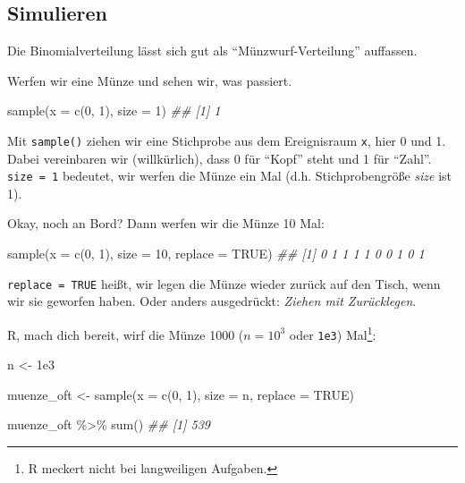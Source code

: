 \documentclass[
  a4paper,
  DIV=11]{scrreprt}
\newenvironment{Shaded}{\begin{snugshade}}{\end{snugshade}}
\newcommand{\AttributeTok}[1]{\textcolor[rgb]{0.40,0.45,0.13}{#1}}
\newcommand{\ConstantTok}[1]{\textcolor[rgb]{0.56,0.35,0.01}{#1}}
\newcommand{\DecValTok}[1]{\textcolor[rgb]{0.68,0.00,0.00}{#1}}
\newcommand{\DocumentationTok}[1]{\textcolor[rgb]{0.37,0.37,0.37}{\textit{#1}}}
\newcommand{\FloatTok}[1]{\textcolor[rgb]{0.68,0.00,0.00}{#1}}
\newcommand{\FunctionTok}[1]{\textcolor[rgb]{0.28,0.35,0.67}{#1}}
\newcommand{\NormalTok}[1]{\textcolor[rgb]{0.00,0.23,0.31}{#1}}
\newcommand{\OtherTok}[1]{\textcolor[rgb]{0.00,0.23,0.31}{#1}}
\newcommand{\SpecialCharTok}[1]{\textcolor[rgb]{0.37,0.37,0.37}{#1}}
\theoremstyle{definition}
\theoremstyle{remark}
\begin{document}
\hypertarget{simulieren}{%
\subsection{Simulieren}\label{simulieren}}

Die Binomialverteilung lässt sich gut als ``Münzwurf-Verteilung''
auffassen.

Werfen wir eine Münze und sehen wir, was passiert.

\begin{Shaded}
\begin{Highlighting}[]
\FunctionTok{sample}\NormalTok{(}\AttributeTok{x =} \FunctionTok{c}\NormalTok{(}\DecValTok{0}\NormalTok{, }\DecValTok{1}\NormalTok{), }\AttributeTok{size =} \DecValTok{1}\NormalTok{)}
\DocumentationTok{\#\# [1] 1}
\end{Highlighting}
\end{Shaded}

Mit \texttt{sample()} ziehen wir eine Stichprobe aus dem Ereignisraum
\texttt{x}, hier 0 und 1. Dabei vereinbaren wir (willkürlich), dass 0
für ``Kopf'' steht und 1 für ``Zahl''. \texttt{size\ =\ 1} bedeutet, wir
werfen die Münze ein Mal (d.h. Stichprobengröße \emph{size} ist 1).

Okay, noch an Bord? Dann werfen wir die Münze 10 Mal:

\begin{Shaded}
\begin{Highlighting}[]
\FunctionTok{sample}\NormalTok{(}\AttributeTok{x =} \FunctionTok{c}\NormalTok{(}\DecValTok{0}\NormalTok{, }\DecValTok{1}\NormalTok{), }\AttributeTok{size =} \DecValTok{10}\NormalTok{, }\AttributeTok{replace =} \ConstantTok{TRUE}\NormalTok{)}
\DocumentationTok{\#\#  [1] 0 1 1 1 1 0 0 1 0 1}
\end{Highlighting}
\end{Shaded}

\texttt{replace\ =\ TRUE} heißt, wir legen die Münze wieder zurück auf
den Tisch, wenn wir sie geworfen haben. Oder anders ausgedrückt:
\emph{Ziehen mit Zurücklegen}.

R, mach dich bereit, wirf die Münze 1000 (\(n=10^3\) oder \texttt{1e3})
Mal\footnote{R meckert nicht bei langweiligen Aufgaben.}:

\begin{Shaded}
\begin{Highlighting}[]
\NormalTok{n }\OtherTok{\textless{}{-}} \FloatTok{1e3}

\NormalTok{muenze\_oft }\OtherTok{\textless{}{-}} 
  \FunctionTok{sample}\NormalTok{(}\AttributeTok{x =} \FunctionTok{c}\NormalTok{(}\DecValTok{0}\NormalTok{, }\DecValTok{1}\NormalTok{), }\AttributeTok{size =}\NormalTok{ n, }\AttributeTok{replace =} \ConstantTok{TRUE}\NormalTok{) }


\NormalTok{muenze\_oft }\SpecialCharTok{\%\textgreater{}\%} 
  \FunctionTok{sum}\NormalTok{()}
\DocumentationTok{\#\# [1] 539}
\end{Highlighting}
\end{Shaded}
\end{document}
